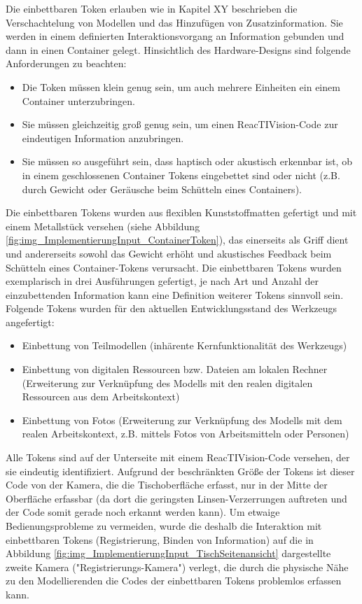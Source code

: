 Die einbettbaren Token erlauben wie in Kapitel XY beschrieben die Verschachtelung von Modellen und das Hinzufügen von Zusatzinformation. Sie werden in einem definierten Interaktionsvorgang an Information gebunden und dann in einen Container gelegt. Hinsichtlich des Hardware-Designs sind folgende Anforderungen zu beachten:
\begin{itemize}
	\item Die Token müssen klein genug sein, um auch mehrere Einheiten ein einem Container unterzubringen.
	\item Sie müssen gleichzeitig groß genug sein, um einen ReacTIVision-Code zur eindeutigen Information anzubringen.
	\item Sie müssen so ausgeführt sein, dass haptisch oder akustisch erkennbar ist, ob in einem geschlossenen Container Tokens eingebettet sind oder nicht (z.B. durch Gewicht oder Geräusche beim Schütteln eines Containers).
\end{itemize}

Die einbettbaren Tokens wurden aus flexiblen Kunststoffmatten gefertigt und mit einem Metallstück versehen (siehe Abbildung \ref{fig:img_ImplementierungInput_ContainerToken}), das einerseits als Griff dient und andererseits sowohl das Gewicht erhöht und akustisches Feedback beim Schütteln eines Container-Tokens verursacht. Die einbettbaren Tokens wurden exemplarisch in drei Ausführungen gefertigt, je nach Art und Anzahl der einzubettenden Information kann eine Definition weiterer Tokens sinnvoll sein. Folgende Tokens wurden für den aktuellen Entwicklungsstand des Werkzeugs angefertigt:
\begin{itemize}
	\item Einbettung von Teilmodellen (inhärente Kernfunktionalität des Werkzeugs)
	\item Einbettung von digitalen Ressourcen bzw. Dateien am lokalen Rechner (Erweiterung zur Verknüpfung des Modells mit den realen digitalen Ressourcen aus dem Arbeitskontext)
	\item Einbettung von Fotos (Erweiterung zur Verknüpfung des Modells mit dem realen Arbeitskontext, z.B. mittels Fotos von Arbeitsmitteln oder Personen)
\end{itemize}

Alle Tokens sind auf der Unterseite mit einem ReacTIVision-Code versehen, der sie eindeutig identifiziert. Aufgrund der beschränkten Größe der Tokens ist dieser Code von der Kamera, die die Tischoberfläche erfasst, nur in der Mitte der Oberfläche erfassbar (da dort die geringsten Linsen-Verzerrungen auftreten und der Code somit gerade noch erkannt werden kann). Um etwaige Bedienungsprobleme zu vermeiden, wurde die deshalb die Interaktion mit einbettbaren Tokens (Registrierung, Binden von Information) auf die in Abbildung \ref{fig:img_ImplementierungInput_TischSeitenansicht} dargestellte zweite Kamera ("Registrierungs-Kamera") verlegt, die durch die physische Nähe zu den Modellierenden die Codes der einbettbaren Tokens problemlos erfassen kann.

